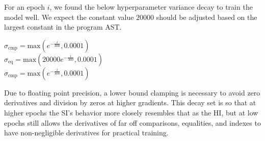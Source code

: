 \documentclass{article}
\begin{document}
For an epoch $i$, we found the below hyperparameter variance decay to train the model well. We expect the constant value $20000$ should be adjusted based on the largest constant in the program AST.
\begin{center}
  $\sigma_{\text{cmp}} = \text{max}(e^{-\frac{i}{300}}, 0.0001)$\\
  $\sigma_{\text{eq}} = \text{max}(20000e^{-\frac{i}{300}}, 0.0001)$\\
  $\sigma_{\text{cmp}} = \text{max}(e^{-\frac{i}{300}}, 0.0001)$\\
\end{center}
Due to floating point precision, a lower bound clamping is necessary to avoid zero derivatives and division by zeros at higher gradients. This decay set is so that at higher epochs the SI's behavior more closely resembles that as the HI, but at low epochs still allows the derivatives of far off comparisons, equalities, and indexes to have non-negligible derivatives for practical training. 


\end{document}

